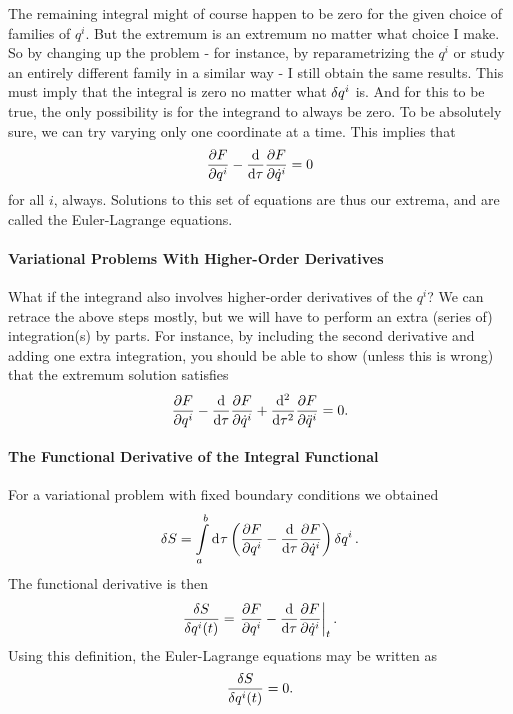 The remaining integral might of course happen to be zero for the given choice of families of $q^{i}$. But the extremum is an extremum no matter what choice I make. So by changing up the problem - for instance, by reparametrizing the $q^{i}$ or study an entirely different family in a similar way - I still obtain the same results. This must imply that the integral is zero no matter what $\var{q^{i}}$ is. And for this to be true, the only possibility is for the integrand to always be zero. To be absolutely sure, we can try varying only one coordinate at a time. This implies that
\begin{align*}
	\pdv{F}{q^{i}} - \dv{\tau}\pdv{F}{\dot{q}^{i}} = 0
\end{align*}
for all $i$, always. Solutions to this set of equations are thus our extrema, and are called the Euler-Lagrange equations.

\paragraph{Variational Problems With Higher-Order Derivatives}
What if the integrand also involves higher-order derivatives of the $q^{i}$? We can retrace the above steps mostly, but we will have to perform an extra (series of) integration(s) by parts. For instance, by including the second derivative and adding one extra integration, you should be able to show (unless this is wrong) that the extremum solution satisfies
\begin{align*}
	\pdv{F}{q^{i}} - \dv{\tau}\pdv{F}{\dot{q}^{i}} + \dv[2]{\tau}\pdv{F}{\ddot{q}^{i}} = 0.
\end{align*}

\paragraph{The Functional Derivative of the Integral Functional}
For a variational problem with fixed boundary conditions we obtained
\begin{align*}
	\var{S} = \int\limits_{a}^{b}\dd[]{\tau}\left(\pdv{F}{q^{i}} - \dv{\tau}\pdv{F}{\dot{q}^{i}}\right)\var{q^{i}}.
\end{align*}
The functional derivative is then
\begin{align*}
	\fdv{S}{q^{i}(t)} = \eval{\pdv{F}{q^{i}} - \dv{\tau}\pdv{F}{\dot{q}^{i}}}_{t}.
\end{align*}
Using this definition, the Euler-Lagrange equations may be written as
\begin{align*}
	\fdv{S}{q^{i}(t)} = 0.
\end{align*}